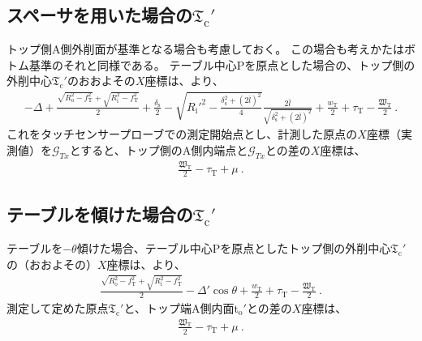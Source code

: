 \subsection[スペーサを用いた場合の\texorpdfstring{$\mathfrak T_\mathrm c'$}{Tc'}]
           {スペーサを用いた場合の$\boldsymbol{\mathfrak T_\mathrm c'}$}
トップ側A側外削面が基準となる場合も考慮しておく。
この場合も考えかたはボトム基準のそれと同様である。
テーブル中心Pを原点とした場合の、トップ側の外削中心$\mathfrak T_\mathrm c'$のおおよその$X$座標は、より、
\begin{align*}
  -\Delta+\frac{\sqrt{R_\mathrm o^2-f_\mathrm T^2}+\sqrt{R_\mathrm i^2-f_\mathrm T^2}}2+\frac{\delta_\mathrm s}2
  -\sqrt{R_\mathrm i'^2-\frac{\delta_\mathrm s^2+(2\bar l)^2}4}\frac{2\bar l}{\sqrt{\delta_\mathrm s^2+(2\bar l)^2}}
  +\frac{w_\mathrm T}2+\tau_\mathrm T-\frac{\mathfrak W_\mathrm T}2\ .
\end{align*}
これをタッチセンサープローブでの測定開始点とし、計測した原点の$X$座標（実測値）を$\mathcal G_{Tx}$とすると、トップ側のA側内端点と$\mathcal G_{Tx}$との差の$X$座標は、
\begin{align*}
  \frac{\mathfrak W_\mathrm T}2-\tau_\mathrm T+\mu~.
\end{align*}


\subsection[テーブルを傾けた場合の\texorpdfstring{$\mathfrak T_\mathrm c'$}{Tc'}]
           {テーブルを傾けた場合の$\boldsymbol{\mathfrak T_\mathrm c'}$}
テーブルを$-\theta$傾けた場合、テーブル中心Pを原点としたトップ側の外削中心$\mathfrak T_\mathrm c'$の（おおよその）$X$座標は、より、
\begin{align}
  \label{eq:gaisakucenterTt}
  \frac{\sqrt{R_\mathrm o^2-f_\mathrm T^2}+\sqrt{R_\mathrm i^2-f_\mathrm T^2}}2-\Delta'\cos\theta
  +\frac{w_\mathrm T}2+\tau_\mathrm T-\frac{\mathfrak W_\mathrm T}2\ .
\end{align}
測定して定めた原点$\mathfrak T_\mathrm c'$と、トップ端A側内面t$_\mathrm o'$との差の$X$座標は、
\begin{align}
  \label{eq:gaisakucenterTr}
  \frac{\mathfrak W_\mathrm T}2-\tau_\mathrm T+\mu~.
\end{align}


